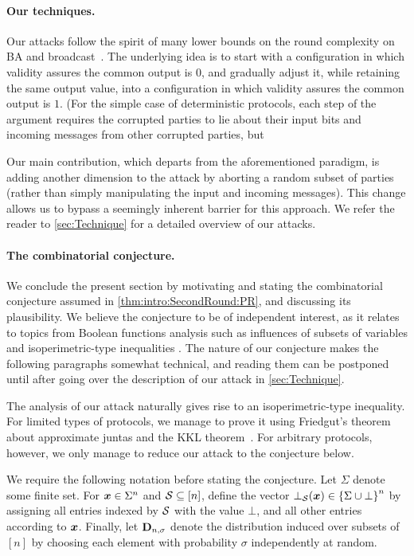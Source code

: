 \paragraph{Our techniques.}
Our attacks follow the spirit of many lower bounds on the round complexity on BA and broadcast~\cite{FL82,DS83,KY86,DRS90,GKKO07,AH10}. The underlying idea is to start with a configuration in which validity assures the common output is $0$, and gradually adjust it, while retaining the same output value, into a configuration in which validity assures the common output is $1$.  (For the simple case of deterministic protocols, each step of the argument requires the corrupted parties to lie about their input bits and incoming messages from other corrupted parties, but %

Our main contribution, which departs from the aforementioned paradigm, is adding another dimension to the attack by aborting a random subset of parties (rather than simply manipulating the input and incoming messages). This change allows us to bypass a seemingly inherent barrier for this approach. We refer the reader to \cref{sec:Technique} for a detailed overview of our attacks.

\paragraph{The combinatorial conjecture.}
We conclude the present section by motivating and stating the combinatorial conjecture assumed in  \cref{thm:intro:SecondRound:PR}, and discussing its plausibility. We believe the conjecture to be of independent interest, as it relates to topics from Boolean functions analysis such as influences of subsets of variables \cite{Odonnel14} and isoperimetric-type inequalities \cite{Mossel2006,Mossel2013}. The nature of our conjecture makes the  following paragraphs somewhat technical, and  reading them can be postponed until after going over the description of our attack in \cref{sec:Technique}.

The analysis of our attack naturally gives rise to an isoperimetric-type inequality. For limited types of protocols, we manage to prove it using Friedgut's theorem \cite{Friedgut} about approximate juntas and the KKL theorem~\cite{KKL88}. For arbitrary protocols, however, we only manage to reduce our attack to the conjecture below.

We require the following notation before stating the conjecture. Let $\Sigma$ denote some finite set.
For ${ \boldsymbol{x}}\in \Sigma^n$ and $\mathcal{S} \subseteq [n]$, define the vector $\bot_{\mathcal{S}}({ \boldsymbol{x}}) \in \left\{\Sigma \cup \bot\right\}^n$ by assigning all entries indexed by $\mathcal{S}$ with the value $\bot$, and all other entries according to ${ \boldsymbol{x}}$. Finally, let $\mathbf{D}_{n,\sigma}$ denote the distribution induced over subsets of $[n]$ by choosing each element with probability $\sigma$ independently at random.

